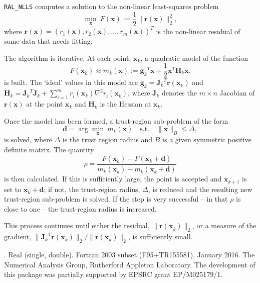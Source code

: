 \documentclass{spec}
\newcommand{\libraryname}{RAL}
\newcommand{\packagename}{NLLS}
\newcommand{\fullpackagename}{\libraryname\_\packagename}
\newcommand{\versionum}{0.5.0}
\newcommand{\versiondate}{15 January 2016}
\newcommand{\vx}{ {\bm x} } %
\newcommand{\vr}{ {\bm r} } %
\newcommand{\vg}{ {\bm g} } %
\newcommand{\vd}{ {\bm d} } %
\newcommand{\vH}{ {\bm H} } %
\newcommand{\vJ}{ {\bm J} } %
\newcommand{\iter}[2][k]{ #2_{#1}^{}} %
\newcommand{\comp}[2][i]{ #2_{#1}^{}} %
\begin{document}
\hslheader

\hslsummary
{\tt \fullpackagename} computes a solution to the non-linear least-squares problem
\begin{equation}
\min_\vx \  F(\vx) := \frac{1}{2}\| \vr(\vx) \|_2^2,
\label{eq:nlls_problem}
\end{equation}
where $\vr(\vx) =(\comp[1]{r}(\vx), \comp[2]{r}(\vx),...,\comp[m]{r}(\vx))^T$ is the non-linear residual of
some data that needs fitting.

The algorithm is iterative.
At each point, $\iter{\vx}$, a quadratic model of the function
\[
F(\iter{\vx}) \approx \iter{m}(\vx) := {\iter{\vg}}^T \vx + \frac{1}{2} {\vx}^T \iter{\vH} \vx.
\]
is built.
The `ideal' values in this model are $\iter{\vg} = {\iter{\vJ}}^T\vr(\iter{\vx})$ and
$\iter{\vH} = {\iter{\vJ}}^T\iter{\vJ} + \sum_{i = 1}^m \comp{r}(\iter{\vx}) \nabla^2 \comp{r}(\iter{\vx})$,
where $\iter{\vJ}$ denotes the $m \times n$ Jacobian of $\vr(\vx)$ at the point $\iter{\vx}$
and $\iter{\vH}$ is the Hessian at $\iter{\vx}$.

Once the model has been formed, a trust-region sub-problem of the form
\[
\vd = \arg \min_{\vx} \ \iter{m} (\vx) \quad \mathrm{s.t.} \quad  \|\vx\|_B \leq \Delta,
\]
is solved,
where $\Delta$ is the trust region radius and $B$ is a given symmetric positive definite matrix.
The quantity
\[\rho = \frac{F(\iter{\vx}) - F(\iter{\vx} + \vd)}{\iter{m}(\iter{\vx}) - \iter{m}(\iter{\vx} + \vd)}\]
is then calculated.
If this is sufficiently large, the point is accepted and  $\iter[k+1]{\vx}$ is set to $\iter{\vx} + \vd$; if not, the trust-region radius, $\Delta$,
is reduced and  the resulting new trust-region sub-problem is solved.  If the step is very successful -- in that $\rho$ is close to one --
the trust-region radius is increased.

This process continues until either the residual, $\|\vr(\iter{\vx})\|_2$, or a measure of the gradient,
$\|{\iter{\vJ}}^T\vr(\iter{\vx})\|_2 / \|\vr(\iter{\vx})\|_2$, is sufficiently small.


\hslattributes
\hslversions{\versionum\ (\versiondate)}.
\hslIRDCZ Real (single, double).
\hsllanguage Fortran 2003 subset (F95+TR155581).
\hsldate January 2016.
\hslorigin The Numerical Analysis Group, Rutherford Appleton Laboratory.
\hslremark The development of this package was
partially supported by EPSRC grant EP/M025179/1.
\end{document}
